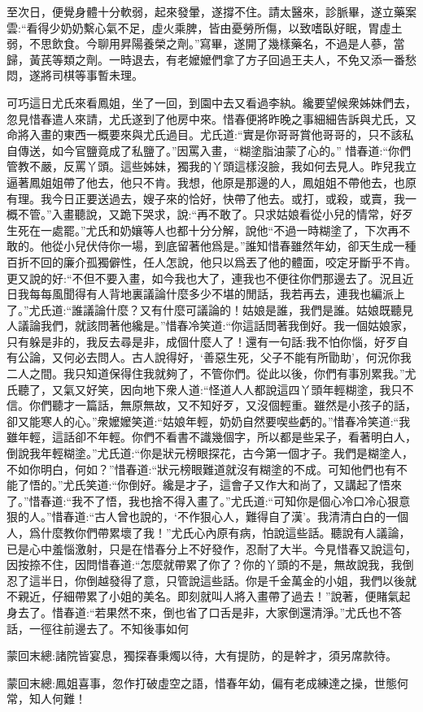 \begin{parag}
    至次日，便覺身體十分軟弱，起來發暈，遂撐不住。請太醫來，診脈畢，遂立藥案雲:“看得少奶奶繫心氣不足，虛火乘脾，皆由憂勞所傷，以致嗜臥好眠，胃虛土弱，不思飲食。今聊用昇陽養榮之劑。”寫畢，遂開了幾樣藥名，不過是人蔘，當歸，黃芪等類之劑。一時退去，有老嬤嬤們拿了方子回過王夫人，不免又添一番愁悶，遂將司棋等事暫未理。
\end{parag}


\begin{parag}
    可巧這日尤氏來看鳳姐，坐了一回，到園中去又看過李紈。纔要望候衆姊妹們去，忽見惜春遣人來請，尤氏遂到了他房中來。惜春便將昨晚之事細細告訴與尤氏，又命將入畫的東西一概要來與尤氏過目。尤氏道:“實是你哥哥賞他哥哥的，只不該私自傳送，如今官鹽竟成了私鹽了。”因罵入畫，“糊塗脂油蒙了心的。” 惜春道:“你們管教不嚴，反罵丫頭。這些姊妹，獨我的丫頭這樣沒臉，我如何去見人。昨兒我立逼著鳳姐姐帶了他去，他只不肯。我想，他原是那邊的人，鳳姐姐不帶他去，也原有理。我今日正要送過去，嫂子來的恰好，快帶了他去。或打，或殺，或賣，我一概不管。”入畫聽說，又跪下哭求，說:“再不敢了。只求姑娘看從小兒的情常，好歹生死在一處罷。”尤氏和奶孃等人也都十分分解，說他“不過一時糊塗了，下次再不敢的。他從小兒伏侍你一場，到底留著他爲是。”誰知惜春雖然年幼，卻天生成一種百折不回的廉介孤獨僻性，任人怎說，他只以爲丟了他的體面，咬定牙斷乎不肯。更又說的好:“不但不要入畫，如今我也大了，連我也不便往你們那邊去了。況且近日我每每風聞得有人背地裏議論什麼多少不堪的閒話，我若再去，連我也編派上了。”尤氏道:“誰議論什麼？又有什麼可議論的！姑娘是誰，我們是誰。姑娘既聽見人議論我們，就該問著他纔是。”惜春冷笑道:“你這話問著我倒好。我一個姑娘家，只有躲是非的，我反去尋是非，成個什麼人了！還有一句話:我不怕你惱，好歹自有公論，又何必去問人。古人說得好，‘善惡生死，父子不能有所勖助’，何況你我二人之間。我只知道保得住我就夠了，不管你們。從此以後，你們有事別累我。”尤氏聽了，又氣又好笑，因向地下衆人道:“怪道人人都說這四丫頭年輕糊塗，我只不信。你們聽才一篇話，無原無故，又不知好歹，又沒個輕重。雖然是小孩子的話，卻又能寒人的心。”衆嬤嬤笑道:“姑娘年輕，奶奶自然要喫些虧的。”惜春冷笑道:“我雖年輕，這話卻不年輕。你們不看書不識幾個字，所以都是些呆子，看著明白人，倒說我年輕糊塗。”尤氏道:“你是狀元榜眼探花，古今第一個才子。我們是糊塗人，不如你明白，何如？”惜春道:“狀元榜眼難道就沒有糊塗的不成。可知他們也有不能了悟的。”尤氏笑道:“你倒好。纔是才子，這會子又作大和尚了，又講起了悟來了。”惜春道:“我不了悟，我也捨不得入畫了。”尤氏道:“可知你是個心冷口冷心狠意狠的人。”惜春道:“古人曾也說的，‘不作狠心人，難得自了漢’。我清清白白的一個人，爲什麼教你們帶累壞了我！”尤氏心內原有病，怕說這些話。聽說有人議論，已是心中羞惱激射，只是在惜春分上不好發作，忍耐了大半。今見惜春又說這句，因按捺不住，因問惜春道:“怎麼就帶累了你了？你的丫頭的不是，無故說我，我倒忍了這半日，你倒越發得了意，只管說這些話。你是千金萬金的小姐，我們以後就不親近，仔細帶累了小姐的美名。即刻就叫人將入畫帶了過去！”說著，便賭氣起身去了。惜春道:“若果然不來，倒也省了口舌是非，大家倒還清淨。”尤氏也不答話，一徑往前邊去了。不知後事如何
\end{parag}


\begin{parag}
    \begin{note}蒙回末總:諸院皆宴息，獨探春秉燭以待，大有提防，的是幹才，須另席款待。\end{note}
\end{parag}


\begin{parag}
    \begin{note}蒙回末總:鳳姐喜事，忽作打破虛空之語，惜春年幼，偏有老成練達之操，世態何常，知人何難！\end{note}
\end{parag}
